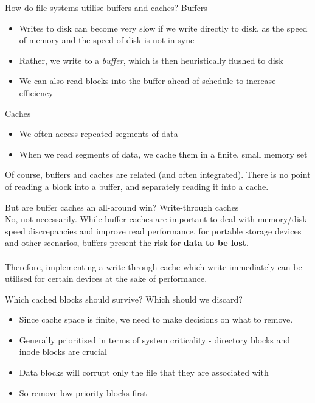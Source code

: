 \documentclass[journal, letterpaper]{IEEEtran}
\begin{document}
\begin{aside}{How do file systems utilise buffers and caches?}
    Buffers
    \begin{itemize}
        \item Writes to disk can become very slow if we write directly to disk, as the speed of memory and the speed of disk is not in sync
        \item Rather, we write to a \textit{buffer}, which is then heuristically flushed to disk
        \item We can also read blocks into the buffer ahead-of-schedule to increase efficiency
    \end{itemize}
    Caches
    \begin{itemize}
        \item We often access repeated segments of data
        \item When we read segments of data, we cache them in a finite, small memory set
    \end{itemize}
    Of course, buffers and caches are related (and often integrated). There is no point of reading a block into a buffer, and separately reading it into a cache.
\end{aside}
\begin{example}{But are buffer caches an all-around win? Write-through caches} \\
    No, not necessarily. While buffer caches are important to deal with memory/disk speed discrepancies and improve read performance, for portable storage devices and other scenarios, buffers present the risk for \textbf{data to be lost}. \\ \\
    Therefore, implementing a write-through cache which write immediately can be utilised for certain devices at the sake of performance.
\end{example}
\begin{aside}{Which cached blocks should survive? Which should we discard?} 
    \begin{itemize}
        \item Since cache space is finite, we need to make decisions on what to remove.
        \item Generally prioritised in terms of system criticality - directory blocks and inode blocks are crucial
        \item Data blocks will corrupt only the file that they are associated with
        \item So remove low-priority blocks first
    \end{itemize}
\end{aside}
\end{document}
